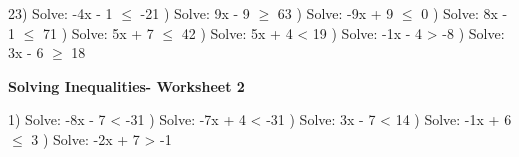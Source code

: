 \documentclass{article}%
\begin{document}
23) Solve: -4x - 1 $\leq$ -21%
\newline%
\newline%
) Solve: 9x - 9 $\geq$ 63%
\newline%
\newline%
) Solve: -9x + 9 $\leq$ 0%
\newline%
\newline%
) Solve: 8x - 1 $\leq$ 71%
\newline%
\newline%
) Solve: 5x + 7 $\leq$ 42%
\newline%
\newline%
) Solve: 5x + 4 < 19%
\newline%
\newline%
) Solve: -1x - 4 > -8%
\newline%
\newline%
) Solve: 3x - 6 $\geq$ 18%
\newline%
\newline%
\newline%
\pagebreak%
\large%
\begin{center}%
\textbf{Solving Inequalities- Worksheet 2}%
\newline%
\newline%
\newline%
\end{center} \normalsize%
1) Solve: -8x - 7 < -31%
\newline%
\newline%
) Solve: -7x + 4 < -31%
\newline%
\newline%
) Solve: 3x - 7 < 14%
\newline%
\newline%
) Solve: -1x + 6 $\leq$ 3%
\newline%
\newline%
) Solve: -2x + 7 > -1%
\newline%
\newline%
\newline%
\end{document}
